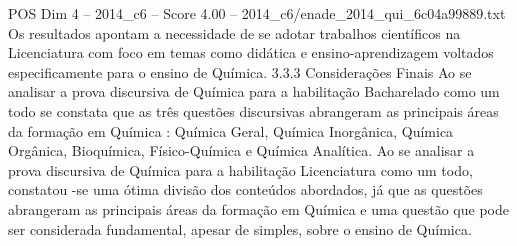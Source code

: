 \begin{textsample}{POS Dim 4 – 2014\_c6 – Score 4.00 – 2014\_c6/enade\_2014\_qui\_6c04a99889.txt}
Os resultados apontam a necessidade de se adotar trabalhos científicos na Licenciatura com foco em temas como didática e ensino-aprendizagem voltados especificamente para o ensino de Química. 3.3.3 Considerações Finais Ao se analisar a prova discursiva de Química para a habilitação Bacharelado como um todo se constata que as três questões discursivas abrangeram as principais áreas da formação em Química : Química Geral, Química Inorgânica, Química Orgânica, Bioquímica, Físico-Química e Química Analítica.
Ao se analisar a prova discursiva de Química para a habilitação Licenciatura como um todo, constatou -se uma ótima divisão dos conteúdos abordados, já que as questões abrangeram as principais áreas da formação em Química e uma questão que pode ser considerada fundamental, apesar de simples, sobre o ensino de Química.

\end{textsample}
